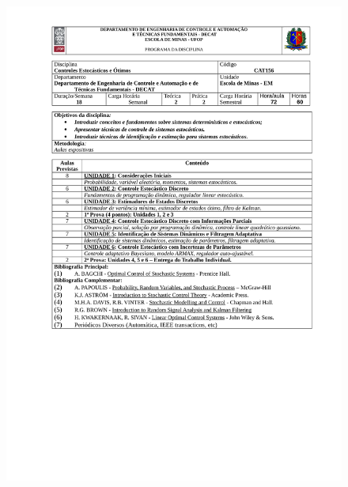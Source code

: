 \begin{figure}[p]
	\centering 
	\includegraphics[scale=0.7]{capitulos/anexo1-programas-disciplina/eg14.pdf}
\end{figure}

